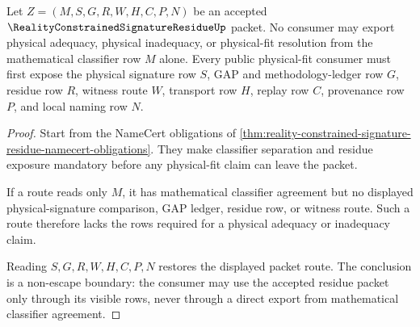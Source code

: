 \begin{theorem}
\label{thm:reality-constrained-signature-residue-nonescape}
Let $Z=(M,S,G,R,W,H,C,P,N)$ be an accepted $\RealityConstrainedSignatureResidueUp$ packet. No consumer may export physical adequacy, physical inadequacy, or physical-fit resolution from the mathematical classifier row $M$ alone. Every public physical-fit consumer must first expose the physical signature row $S$, GAP and methodology-ledger row $G$, residue row $R$, witness route $W$, transport row $H$, replay row $C$, provenance row $P$, and local naming row $N$.
\end{theorem}
\begin{proof}
Start from the NameCert obligations of \autoref{thm:reality-constrained-signature-residue-namecert-obligations}. They make classifier separation and residue exposure mandatory before any physical-fit claim can leave the packet.

If a route reads only $M$, it has mathematical classifier agreement but no displayed physical-signature comparison, GAP ledger, residue row, or witness route. Such a route therefore lacks the rows required for a physical adequacy or inadequacy claim.

Reading $S,G,R,W,H,C,P,N$ restores the displayed packet route. The conclusion is a non-escape boundary: the consumer may use the accepted residue packet only through its visible rows, never through a direct export from mathematical classifier agreement.
\end{proof}

